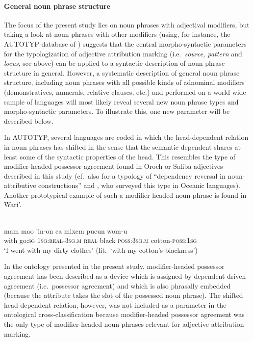\paragraph{General noun phrase structure} The focus of the present study lies on noun phrases with adjectival modifiers, but taking a look at noun phrases with other modifiers (using, for instance, the AUTOTYP database of \citealt{AUTOTYP-NP}) suggests that the central morpho-syntactic parameters for the typologization of adjective attribution marking (i.e.~\textit{source, pattern} and \textit{locus}, see above) can be applied to a syntactic description of noun phrase structure in general. However, a systematic description of general noun phrase structure, including noun phrases with all possible kinds of adnominal modifiers (demonstratives, numerals, relative clauses, etc.) and performed on a world-wide sample of languages will most likely reveal several new noun phrase types and morpho-syntactic parameters. To illustrate this, one new parameter will be described below.   

In AUTOTYP, several languages are coded in which the head-dependent relation in noun phrases has shifted in the sense that the semantic dependent shares at least some of the syntactic properties of the head. This resembles the type of modifier-headed possessor agreement found in Oroch or Saliba adjectives described in this study (cf.~also \citealt{malchukov2000} for a typology of “dependency reversal in noun-attributive constructions” and \citealt{ross1998}, who surveyed this type in Oceanic languages). Another prototypical example of such a modifier-headed noun phrase is found in Wari'.
\begin{exe}
\ex \label{ex1} \\
  \gll	mam mao 'in-on		ca	    mixem  pucun	wom-u\\
  	with  go:\textsc{sg}  \textsc{1sg:real-3sg.m}	\textsc{real}  black    \textsc{poss:3sg.m}	cotton-\textsc{poss:1sg}\\
  \glt ‘I went with my dirty clothes’ (lit.~‘with my cotton's blackness’)
\end{exe}
In the ontology presented in the present study, modifier-headed possessor agreement has been described as a device which is assigned by dependent-driven agreement (i.e.~possessor agreement) and which is also phrasally embedded (because the attribute takes the slot of the possessed noun phrase). The shifted head-dependent relation, however, was not included as a parameter in the ontological cross-classification because modifier-headed possessor agreement was the only type of modifier-headed noun phrases relevant for adjective attribution marking.

